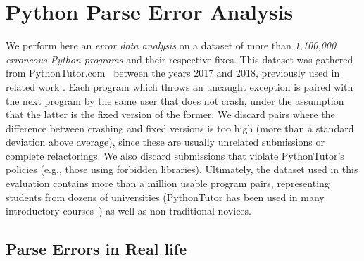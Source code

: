 \section{Python Parse Error Analysis}
\label{sec:error-analysis}

We perform here an \emph{error data analysis} on a \python dataset of more than
\emph{1,100,000 erroneous Python programs} and their respective fixes. This
dataset was gathered from PythonTutor.com~\citep{Guo2013} between the years 2017
and 2018, previously used in related work \citep{Endres2019, Cosman2020}. Each
program which throws an uncaught \python exception is paired with the next
program by the same user that does not crash, under the assumption that the
latter is the fixed version of the former. We discard pairs where the difference
between crashing and fixed versions is too high (more than a standard deviation
above average), since these are usually unrelated submissions or complete
refactorings. We also discard submissions that violate PythonTutor's policies
(e.g., those using forbidden libraries). Ultimately, the dataset used in this
evaluation contains more than a million usable program pairs, representing
students from dozens of universities (PythonTutor has been used in many
introductory courses~\citep{Guo2013}) as well as non-traditional novices.

\subsection{Parse Errors in Real life}
\label{sec:error-analysis:syntax}

